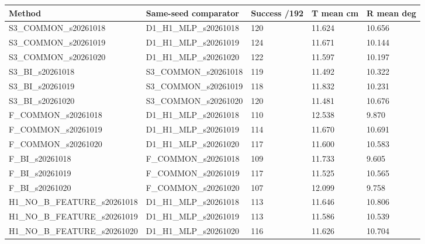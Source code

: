 \begin{tabular}{lllll}
\hline
Method & Same-seed comparator & Success /192 & T mean cm & R mean deg \\
\hline
S3\_COMMON\_s20261018 & D1\_H1\_MLP\_s20261018 & 120 & 11.624 & 10.656 \\
S3\_COMMON\_s20261019 & D1\_H1\_MLP\_s20261019 & 124 & 11.671 & 10.144 \\
S3\_COMMON\_s20261020 & D1\_H1\_MLP\_s20261020 & 122 & 11.597 & 10.197 \\
S3\_BI\_s20261018 & S3\_COMMON\_s20261018 & 119 & 11.492 & 10.322 \\
S3\_BI\_s20261019 & S3\_COMMON\_s20261019 & 118 & 11.832 & 10.231 \\
S3\_BI\_s20261020 & S3\_COMMON\_s20261020 & 120 & 11.481 & 10.676 \\
F\_COMMON\_s20261018 & D1\_H1\_MLP\_s20261018 & 110 & 12.538 & 9.870 \\
F\_COMMON\_s20261019 & D1\_H1\_MLP\_s20261019 & 114 & 11.670 & 10.691 \\
F\_COMMON\_s20261020 & D1\_H1\_MLP\_s20261020 & 117 & 11.600 & 10.583 \\
F\_BI\_s20261018 & F\_COMMON\_s20261018 & 109 & 11.733 & 9.605 \\
F\_BI\_s20261019 & F\_COMMON\_s20261019 & 117 & 11.525 & 10.565 \\
F\_BI\_s20261020 & F\_COMMON\_s20261020 & 107 & 12.099 & 9.758 \\
H1\_NO\_B\_FEATURE\_s20261018 & D1\_H1\_MLP\_s20261018 & 113 & 11.646 & 10.806 \\
H1\_NO\_B\_FEATURE\_s20261019 & D1\_H1\_MLP\_s20261019 & 113 & 11.586 & 10.539 \\
H1\_NO\_B\_FEATURE\_s20261020 & D1\_H1\_MLP\_s20261020 & 116 & 11.626 & 10.704 \\
\hline
\end{tabular}
